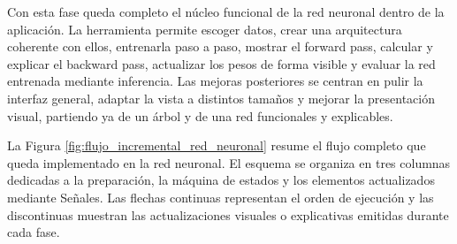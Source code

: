 Con esta fase queda completo el núcleo funcional de la red neuronal dentro de la aplicación.
La herramienta permite escoger datos, crear una arquitectura coherente con ellos, entrenarla paso a paso, mostrar el forward pass, calcular y explicar el backward pass, actualizar los pesos de forma visible y evaluar la red entrenada mediante inferencia.
Las mejoras posteriores se centran en pulir la interfaz general, adaptar la vista a distintos tamaños y mejorar la presentación visual, partiendo ya de un árbol y de una red funcionales y explicables.

La Figura \ref{fig:flujo_incremental_red_neuronal} resume el flujo completo que queda implementado en la red neuronal.
El esquema se organiza en tres columnas dedicadas a la preparación, la máquina de estados y los elementos actualizados mediante Señales.
Las flechas continuas representan el orden de ejecución y las discontinuas muestran las actualizaciones visuales o explicativas emitidas durante cada fase.

